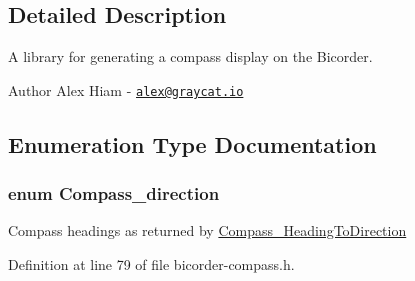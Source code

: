 \subsection{Detailed Description}
A library for generating a compass display on the Bicorder. 

\begin{DoxyAuthor}{Author}
Alex Hiam -\/ \href{mailto:alex@graycat.io}{\tt alex@graycat.\+io} 
\end{DoxyAuthor}


\subsection{Enumeration Type Documentation}
\subsubsection[{\texorpdfstring{Compass\+\_\+direction}{Compass_direction}}]{\setlength{\rightskip}{0pt plus 5cm}enum {\bf Compass\+\_\+direction}}\hypertarget{bicorder-compass_8h_a642eb4472a57f1a847ee101e3b7af5ba}{}\label{bicorder-compass_8h_a642eb4472a57f1a847ee101e3b7af5ba}
Compass headings as returned by \hyperlink{bicorder-compass_8h_a1051f457631ee90b4f082177cf19d469}{Compass\+\_\+\+Heading\+To\+Direction} 

Definition at line 79 of file bicorder-\/compass.\+h.

